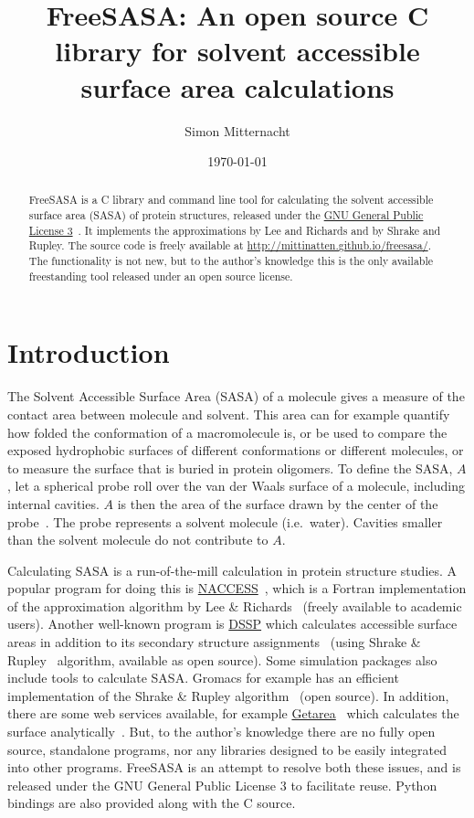 \documentclass[a4paper,11pt]{article}
\author{Simon Mitternacht}
\date{\today}
\title{FreeSASA: An open source C library for solvent accessible surface
  area calculations
}
\begin{document}
\maketitle

\begin{abstract}
FreeSASA is a C library and command line tool for calculating the
solvent accessible surface area (SASA) of protein structures, released
under the \href{http://www.gnu.org/licenses/gpl.html}{GNU General
  Public License 3}~\cite{GPL}. It implements the approximations by
Lee and Richards and by Shrake and Rupley. The source code is freely
available at \url{http://mittinatten.github.io/freesasa/}. The
functionality is not new, but to the author's knowledge this is the
only available freestanding tool released under an open source
license.
\end{abstract}

\section{Introduction}
The Solvent Accessible Surface Area (SASA) of a molecule gives a
measure of the contact area between molecule and solvent. This area
can for example quantify how folded the conformation of a
macromolecule is, or be used to compare the exposed hydrophobic
surfaces of different conformations or different molecules, or to
measure the surface that is buried in protein oligomers. To define the
SASA, $A$, let a spherical probe roll over the van der Waals surface of
a molecule, including internal cavities. $A$ is then the area of the
surface drawn by the center of the probe~\cite{LnR}. The probe
represents a solvent molecule (i.e.\ water). Cavities smaller than the
solvent molecule do not contribute to $A$.

Calculating SASA is a run-of-the-mill calculation in protein structure
studies. A popular program for doing this is
\href{http://www.bioinf.manchester.ac.uk/naccess/}{NACCESS}~\cite{NACCESS},
which is a Fortran implementation of the approximation algorithm by
Lee \& Richards~\cite{LnR} (freely available to academic
users). Another well-known program is
\href{http://swift.cmbi.ru.nl/gv/dssp/}{DSSP} which calculates
accessible surface areas in addition to its secondary structure
assignments~\cite{DSSP} (using Shrake \& Rupley~\cite{SnR} algorithm,
available as open source). Some simulation packages also include tools
to calculate SASA. Gromacs for example has an efficient implementation
of the Shrake \& Rupley algorithm~\cite{DCLM} (open source). In
addition, there are some web services available, for example
\href{http://curie.utmb.edu/getarea.html}{Getarea}~\cite{GetAreaURL}
which calculates the surface analytically~\cite{Getarea}. But, to the
author's knowledge there are no fully open source, standalone
programs, nor any libraries designed to be easily integrated into
other programs. FreeSASA is an attempt to resolve both these issues,
and is released under the GNU General Public License 3 to facilitate
reuse. Python bindings are also provided along with the C source.
\end{document}
